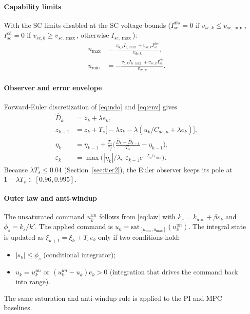 \paragraph{Capability limits} With the SC limits disabled at the SC voltage bounds ($I^{dis}_{sc}=0$ if $v_{sc,k}\le v_{sc,\min}$, $I^{ch}_{sc}=0$ if $v_{sc,k}\ge v_{sc,\max}$, otherwise $I_{sc,\max}$):
\begin{align}
u_{\max}&=\frac{v_{b,k}I_{b,\max}+v_{sc,k}I^{dis}_{sc}}{v_{dc,k}},\nonumber\\
u_{\min}&=-\frac{v_{b,k}I_{b,\max}+v_{sc,k}I^{ch}_{sc}}{v_{dc,k}}.\label{eq:ulim}
\end{align}

\paragraph{Observer and error envelope} Forward-Euler discretization of \eqref{eq:ndo} and \eqref{eq:env} gives
\begin{align}
\hat D_k&=z_k+\lambda e_k,\nonumber\\
z_{k+1}&=z_k+T_s\big[-\lambda z_k-\lambda(u_k/C_{dc,n}+\lambda e_k)\big],\label{eq:zdisc}\\
\eta_k&=\eta_{k-1}+\tfrac{T_s}{\tau_f}\Big(\tfrac{\hat D_k-\hat D_{k-1}}{T_s}-\eta_{k-1}\Big),\nonumber\\
\varepsilon_k&=\max\!\big(|\eta_k|/\lambda,\ \varepsilon_{k-1}e^{-T_s/\tau_{env}}\big).\label{eq:envdisc}
\end{align}
Because $\lambda T_s\le0.04$ (Section~\ref{sec:tier2}), the Euler observer keeps its pole at $1-\lambda T_s\in[0.96,0.995]$.

\paragraph{Outer law and anti-windup} The unsaturated command $u^{un}_k$ follows from \eqref{eq:law} with $k_s=k_{\min}+\beta\varepsilon_k$ and $\phi_s=k_s/k'$. The applied command is $u_k=\mathrm{sat}_{[u_{\min},u_{\max}]}(u^{un}_k)$. The integral state is updated as $\xi_{k+1}=\xi_k+T_se_k$ only if two conditions hold:
\begin{itemize}
\item $|s_k|\le\phi_s$ (conditional integrator);
\item $u_k=u^{un}_k$ or $(u^{un}_k-u_k)e_k>0$ (integration that drives the command back into range).
\end{itemize}
The same saturation and anti-windup rule is applied to the PI and MPC baselines.

